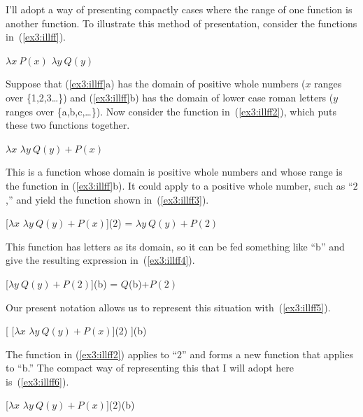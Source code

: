 I'll adopt a way of presenting compactly cases where the range of one function is another function. To illustrate this method of presentation, consider the functions in~(\ref{ex3:illff}).
\enlargethispage*{15pt}
\begin{exe}
	\raggedright
	\ex \label{ex3:illff} 
	\begin{xlist}
		\ex $\lambda x\ P(x)$
		\ex $\lambda y\ Q(y)$
	\end{xlist}
\end{exe}
Suppose that (\ref{ex3:illff}a) has the domain of positive whole numbers ($x$ ranges over \{1,2,3\ldots\}) and (\ref{ex3:illff}b) has the domain of lower case roman letters ($y$ ranges over \{a,b,c,\ldots\}). Now consider the function in~(\ref{ex3:illff2}), which puts these two functions together.
\begin{exe}
	\raggedright
	\ex \label{ex3:illff2} 
	$\lambda x$ $\lambda y\ Q(y)+P(x)$ 
\end{exe}
This is a function whose domain is positive whole numbers and whose range is the function in (\ref{ex3:illff}b). It could apply to a positive whole number, such as ``$2$,'' and yield the function shown in~(\ref{ex3:illff3}).
\begin{exe}
	\raggedright
	\ex \label{ex3:illff3} 
	{} [$\lambda x$ $\lambda y\ Q(y)+P(x)$]($2$) = $\lambda y \ Q(y)+P(2)$
\end{exe}
This function has letters as its domain, so it can be fed something like ``b'' and give the resulting expression in~(\ref{ex3:illff4}).
\begin{exe}
	\raggedright
	\ex \label{ex3:illff4} 
	{} [$\lambda y\ Q(y)+P(2)$](b) = $Q$(b)+$P(2)$
\end{exe}
Our present notation allows us to represent this situation with~(\ref{ex3:illff5}).
\begin{exe}
	\raggedright
	\ex \label{ex3:illff5} 
	{} [ [$\lambda x$ $\lambda y\ Q(y)+P(x)$]($2$) ](b)
\end{exe}
The function in (\ref{ex3:illff2}) applies to ``$2$'' and forms a new function that applies to ``b.'' The compact way of representing this that I will adopt here is~(\ref{ex3:illff6}).
\begin{exe}
	\raggedright
	\ex \label{ex3:illff6} 
	{}[$\lambda x$ $\lambda y\ Q(y)+P(x)]$($2$)(b)
\end{exe}

